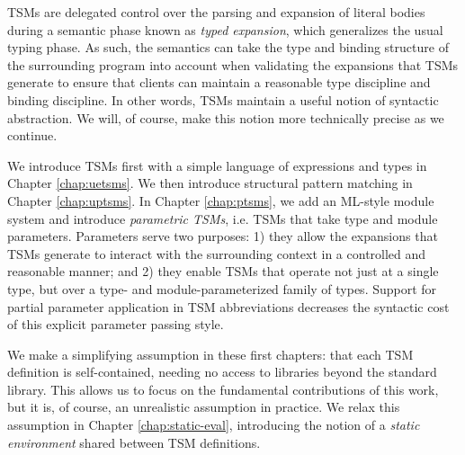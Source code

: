 TSMs are delegated control over the parsing and expansion of literal bodies during a semantic phase known as \emph{typed expansion}, which generalizes the usual typing phase. As such, the semantics can take the type and binding structure of the surrounding program into account when validating the expansions that TSMs generate to ensure that clients can maintain a reasonable type discipline and binding discipline. In other words, TSMs maintain a useful notion of syntactic abstraction. %
We will, of course, make this notion more technically precise as we continue.

We introduce TSMs first with a simple language of expressions and types in Chapter \ref{chap:uetsms}. We then introduce structural pattern matching  in Chapter \ref{chap:uptsms}. In Chapter \ref{chap:ptsms}, we add an ML-style module system and introduce \emph{parametric TSMs}, i.e. TSMs that take type and module parameters. Parameters serve two purposes: 1) they allow the expansions that TSMs generate to interact with the surrounding context in a controlled and reasonable manner; and 2) they enable TSMs that operate not just at a single type, but over a type- and module-parameterized family of types. Support for partial parameter application in TSM abbreviations decreases the syntactic cost of this explicit parameter passing style.

We make a simplifying assumption in these first chapters: that each TSM definition is self-contained, needing no access to libraries beyond the standard library. This allows us to focus on the fundamental contributions of this work, but it is, of course, an unrealistic assumption in practice. We relax this assumption in Chapter \ref{chap:static-eval}, introducing the notion of a \emph{static environment} shared between TSM definitions.

